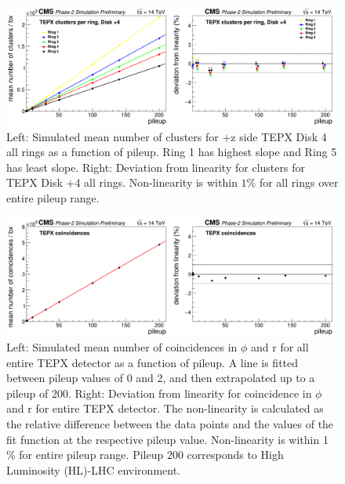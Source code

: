 \begin{figure}[H]
  \centering
  \includegraphics[width=1\columnwidth]{./clustersperringD+4.png}
  \caption{Left: Simulated mean number of clusters for +z side TEPX Disk 4 all rings as a function of pileup. Ring 1 has highest slope and Ring 5 has least slope. Right: Deviation from linearity for clusters for TEPX Disk +4 all rings. Non-linearity is within $1\%$ for all rings over entire pileup range.}
  \label{fig:CMS}
\end{figure}


\begin{figure}[H]
  \centering
  \includegraphics[width=1 \columnwidth]{./totalcoincidences.png}
  \caption{Left: Simulated mean number of coincidences in $\phi$ and r for all entire TEPX detector as a function of pileup. A line is fitted between pileup values of 0 and 2, and then extrapolated up to a pileup of 200. Right: Deviation from linearity for coincidence in $\phi$ and r for entire TEPX detector. The non-linearity is calculated as the relative difference between the data points and the values of the fit function at the respective pileup value. Non-linearity is within 1 \% for entire pileup range. Pileup 200 corresponds to High Luminosity (HL)-LHC environment.}
  \label{fig:CMS}
\end{figure}


